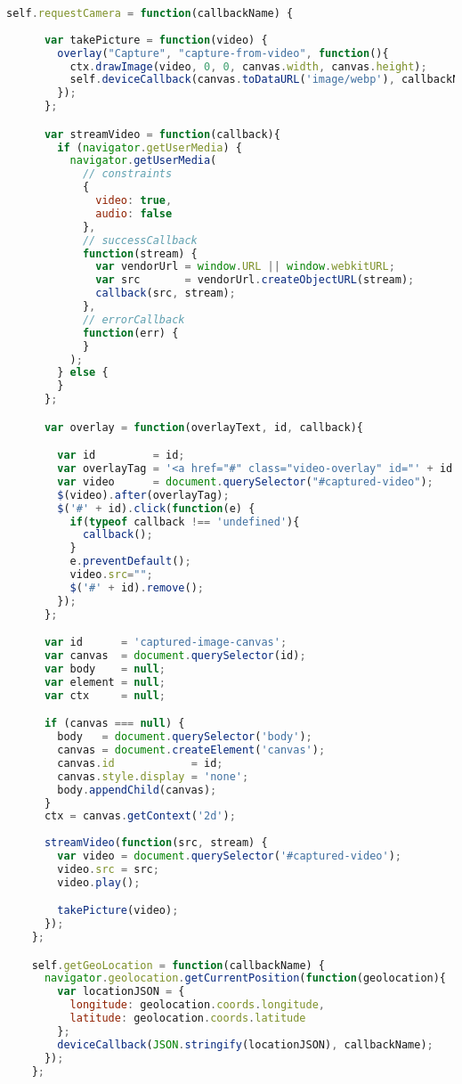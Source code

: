 \begin{appendices}
\begin{lstlisting}[language=JavaScript]
    self.requestCamera = function(callbackName) {
      
      var takePicture = function(video) {
        overlay("Capture", "capture-from-video", function(){
          ctx.drawImage(video, 0, 0, canvas.width, canvas.height);
          self.deviceCallback(canvas.toDataURL('image/webp'), callbackName);
        });
      };

      var streamVideo = function(callback){
        if (navigator.getUserMedia) {
          navigator.getUserMedia(
            // constraints
            {
              video: true,
              audio: false
            },
            // successCallback
            function(stream) {
              var vendorUrl = window.URL || window.webkitURL;
              var src       = vendorUrl.createObjectURL(stream);
              callback(src, stream);
            },
            // errorCallback
            function(err) {
            }
          );
        } else {
        }
      };

      var overlay = function(overlayText, id, callback){

        var id         = id;
        var overlayTag = '<a href="#" class="video-overlay" id="' + id + '">' + overlayText + '</a>';
        var video      = document.querySelector("#captured-video");
        $(video).after(overlayTag);
        $('#' + id).click(function(e) {
          if(typeof callback !== 'undefined'){
            callback();
          }
          e.preventDefault();
          video.src="";
          $('#' + id).remove();
        });
      };

      var id      = 'captured-image-canvas';
      var canvas  = document.querySelector(id);
      var body    = null;
      var element = null;
      var ctx     = null;

      if (canvas === null) {
        body   = document.querySelector('body');
        canvas = document.createElement('canvas');
        canvas.id            = id;
        canvas.style.display = 'none';
        body.appendChild(canvas);
      }
      ctx = canvas.getContext('2d');
      
      streamVideo(function(src, stream) {
        var video = document.querySelector('#captured-video');
        video.src = src;
        video.play();

        takePicture(video);
      });
    };

    self.getGeoLocation = function(callbackName) {
      navigator.geolocation.getCurrentPosition(function(geolocation){
        var locationJSON = {
          longitude: geolocation.coords.longitude,
          latitude: geolocation.coords.latitude
        };
        deviceCallback(JSON.stringify(locationJSON), callbackName);
      });
    };


\end{lstlisting}
\end{appendices}
